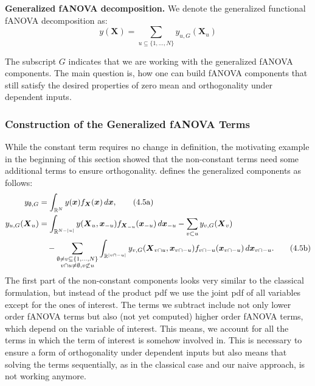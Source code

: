 \begin{definition}
    \textbf{Generalized fANOVA decomposition.}
    We denote the generalized functional fANOVA decomposition as:
    \begin{equation}
        y(\boldsymbol{X}) = \sum_{u \subseteq \{1, \dots, N\}} y_{u, G}(\boldsymbol{X}_u)
    \end{equation}
\end{definition}
The subscript $G$ indicates that we are working with the generalized fANOVA components.
The main question is, how one can build fANOVA components that still satisfy the desired properties of zero mean and orthogonality under dependent inputs.

\subsubsection*{Construction of the Generalized fANOVA Terms}
While the constant term requires no change in definition, the motivating example in the beginning of this section showed that the non-constant terms need some additional terms to ensure orthogonality. \cite{rahman2014} defines the generalized components as follows:
\begin{align}
y_{\emptyset, G} &= \int_{\mathbb{R}^N} y(\boldsymbol{x}) f_{\boldsymbol{X}}(\boldsymbol{x}) \, d\boldsymbol{x}, \tag{4.5a} \\
y_{u,G}(\boldsymbol{X}_u) &= \int_{\mathbb{R}^{N - |u|}} y(\boldsymbol{X}_u, \boldsymbol{x}_{-u}) f_{\boldsymbol{X}_{-u}}(\boldsymbol{x}_{-u}) \, d\boldsymbol{x}_{-u}
- \sum_{v \subset u} y_{v,G}(\boldsymbol{X}_v) \notag \\
&\quad - \sum_{\substack{\emptyset \neq v \subseteq \{1, \ldots, N\} \\ v \cap u \neq \emptyset, v \not\subset u}}
\int_{\mathbb{R}^{|v \cap -u|}} y_{v,G}(\boldsymbol{X}_{v \cap u}, \boldsymbol{x}_{v \cap -u}) 
f_{v \cap -u}(\boldsymbol{x}_{v \cap -u}) \, d\boldsymbol{x}_{v \cap -u}. \tag{4.5b}
\label{eq:generalized_fanova_components_rahman}
\end{align}
The first part of the non-constant components looks very similar to the classical formulation, but instead of the product pdf we use the joint pdf of all variables except for the ones of interest. The terms we subtract include not only lower order fANOVA terms but also (not yet computed) higher order fANOVA terms, which depend on the variable of interest.
This means, we account for all the terms in which the term of interest is somehow involved in. This is necessary to ensure a form of orthogonality under dependent inputs but also means that solving the terms sequentially, as in the classical case and our naive approach, is not working anymore.

